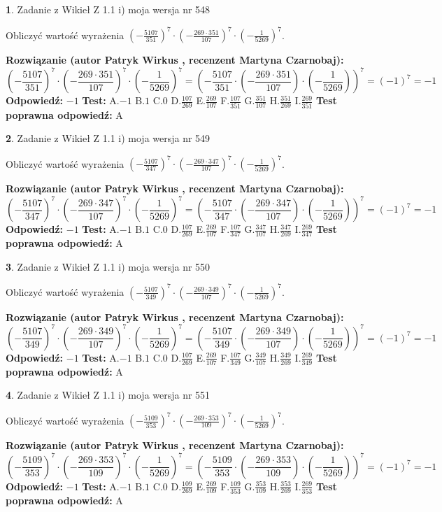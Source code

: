 \documentclass[12pt, a4paper]{article}
\theoremstyle{definition} %
\newtheorem{zad}{}
\newcommand{\zadStart}[1]{\begin{zad}#1\newline}
\newcommand{\zadStop}{\end{zad}}
\newcommand{\rozwStart}[2]{\noindent \textbf{Rozwiązanie (autor #1 , recenzent #2): }\newline}
\newcommand{\rozwStop}{\newline}
\newcommand{\odpStart}{\noindent \textbf{Odpowiedź:}\newline}
\newcommand{\odpStop}{\newline}
\newcommand{\testStart}{\noindent \textbf{Test:}\newline}
\newcommand{\testStop}{\newline}
\newcommand{\kluczStart}{\noindent \textbf{Test poprawna odpowiedź:}\newline}
\newcommand{\kluczStop}{\newline}
\begin{document}
\zadStart{Zadanie z Wikieł Z 1.1 i) moja wersja nr 548}

Obliczyć wartość wyrażenia $(-\frac{5107}{351})^{7} \cdot (-\frac{269 \cdot 351}{107})^{7} \cdot (-\frac{1}{5269})^{7}$.
\zadStop
\rozwStart{Patryk Wirkus}{Martyna Czarnobaj}
$$(-\frac{5107}{351})^{7} \cdot (-\frac{269 \cdot 351}{107})^{7} \cdot (-\frac{1}{5269})^{7} = (-\frac{5107}{351} \cdot (-\frac{269 \cdot 351}{107}) \cdot (-\frac{1}{5269}))^{7} = (-1)^{7} = -1$$
\rozwStop
\odpStart
$-1$
\odpStop
\testStart
A.$-1$ B.$1$ C.$0$ D.$\frac{107}{269}$ E.$\frac{269}{107}$
F.$\frac{107}{351}$ G.$\frac{351}{107}$
H.$\frac{351}{269}$
I.$\frac{269}{351}$
\testStop
\kluczStart
A
\kluczStop



\zadStart{Zadanie z Wikieł Z 1.1 i) moja wersja nr 549}

Obliczyć wartość wyrażenia $(-\frac{5107}{347})^{7} \cdot (-\frac{269 \cdot 347}{107})^{7} \cdot (-\frac{1}{5269})^{7}$.
\zadStop
\rozwStart{Patryk Wirkus}{Martyna Czarnobaj}
$$(-\frac{5107}{347})^{7} \cdot (-\frac{269 \cdot 347}{107})^{7} \cdot (-\frac{1}{5269})^{7} = (-\frac{5107}{347} \cdot (-\frac{269 \cdot 347}{107}) \cdot (-\frac{1}{5269}))^{7} = (-1)^{7} = -1$$
\rozwStop
\odpStart
$-1$
\odpStop
\testStart
A.$-1$ B.$1$ C.$0$ D.$\frac{107}{269}$ E.$\frac{269}{107}$
F.$\frac{107}{347}$ G.$\frac{347}{107}$
H.$\frac{347}{269}$
I.$\frac{269}{347}$
\testStop
\kluczStart
A
\kluczStop



\zadStart{Zadanie z Wikieł Z 1.1 i) moja wersja nr 550}

Obliczyć wartość wyrażenia $(-\frac{5107}{349})^{7} \cdot (-\frac{269 \cdot 349}{107})^{7} \cdot (-\frac{1}{5269})^{7}$.
\zadStop
\rozwStart{Patryk Wirkus}{Martyna Czarnobaj}
$$(-\frac{5107}{349})^{7} \cdot (-\frac{269 \cdot 349}{107})^{7} \cdot (-\frac{1}{5269})^{7} = (-\frac{5107}{349} \cdot (-\frac{269 \cdot 349}{107}) \cdot (-\frac{1}{5269}))^{7} = (-1)^{7} = -1$$
\rozwStop
\odpStart
$-1$
\odpStop
\testStart
A.$-1$ B.$1$ C.$0$ D.$\frac{107}{269}$ E.$\frac{269}{107}$
F.$\frac{107}{349}$ G.$\frac{349}{107}$
H.$\frac{349}{269}$
I.$\frac{269}{349}$
\testStop
\kluczStart
A
\kluczStop



\zadStart{Zadanie z Wikieł Z 1.1 i) moja wersja nr 551}

Obliczyć wartość wyrażenia $(-\frac{5109}{353})^{7} \cdot (-\frac{269 \cdot 353}{109})^{7} \cdot (-\frac{1}{5269})^{7}$.
\zadStop
\rozwStart{Patryk Wirkus}{Martyna Czarnobaj}
$$(-\frac{5109}{353})^{7} \cdot (-\frac{269 \cdot 353}{109})^{7} \cdot (-\frac{1}{5269})^{7} = (-\frac{5109}{353} \cdot (-\frac{269 \cdot 353}{109}) \cdot (-\frac{1}{5269}))^{7} = (-1)^{7} = -1$$
\rozwStop
\odpStart
$-1$
\odpStop
\testStart
A.$-1$ B.$1$ C.$0$ D.$\frac{109}{269}$ E.$\frac{269}{109}$
F.$\frac{109}{353}$ G.$\frac{353}{109}$
H.$\frac{353}{269}$
I.$\frac{269}{353}$
\testStop
\kluczStart
A
\kluczStop
\end{document}
